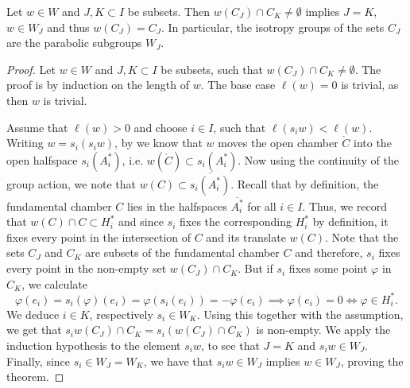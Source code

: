 \begin{theorem}\label{thm:stabilizer}
    Let \(w\in W\) and \(J, K \subset I\) be subsets.
    Then \(w(C_J)\cap C_K \neq \emptyset\) implies \(J = K\), \(w\in W_J\) and thus \(w(C_J) = C_J\).
    In particular, the isotropy groups of the sets \(C_J\) are the parabolic subgroups \(W_J\).
\end{theorem}
\begin{proof}
    Let \(w\in W\) and \(J, K\subset I\) be subsets, such that \(w(C_J)\cap C_K \neq \emptyset\).
    The proof is by induction on the length of \(w\).
    The base case \(\ell(w) = 0\) is trivial, as then \(w\) is trivial.

    Assume that \(\ell(w) > 0\) and choose \(i\in I\), such that \(\ell(s_iw) < \ell(w)\).
    Writing \(w = s_i(s_iw)\), by  we know that \(w\) moves the open chamber \(\mathring{C}\) into the open halfspace \(s_i(A_i^*)\), i.e. \(w(\mathring{C})\subset s_i(A_i^*)\).
    Now using the continuity of the group action, we note that \(w(C) \subset \overline{s_i(A_i^*)}\). %
    Recall that by definition, the fundamental chamber \(C\) lies in the halfspaces \(\overline{A_i^*}\) for all \(i \in I\).
    Thus, we record that \(w(C) \cap C \subset H_i^*\) and since \(s_i\) fixes the corresponding \(H_i^*\) by definition, it fixes every point in the intersection of \(C\) and its translate \(w(C)\).
    Note that the sets \(C_J\) and \(C_K\) are subsets of the fundamental chamber \(C\) and therefore, \(s_i\) fixes every point in the non-empty set \(w(C_J)\cap C_K\).
    But if \(s_i\) fixes some point \(\varphi\) in \(C_K\), we calculate
    \[\varphi(e_i) = s_i(\varphi)(e_i) = \varphi(s_i(e_i)) = -\varphi(e_i) \implies \varphi(e_i) = 0 \iff \varphi\in H_i^*.\]
    We deduce \(i\in K\), respectively \(s_i\in W_K\).
    Using this together with the assumption, we get that \(s_iw(C_J)\cap C_K = s_i(w(C_J)\cap C_K)\) is non-empty.
    We apply the induction hypothesis to the element \(s_iw\), to see that \(J = K\) and \(s_iw\in W_J\).
    Finally, since \(s_i\in W_J = W_K\), we have that \(s_iw \in W_J\) implies \(w\in W_J\), proving the theorem.
\end{proof}

